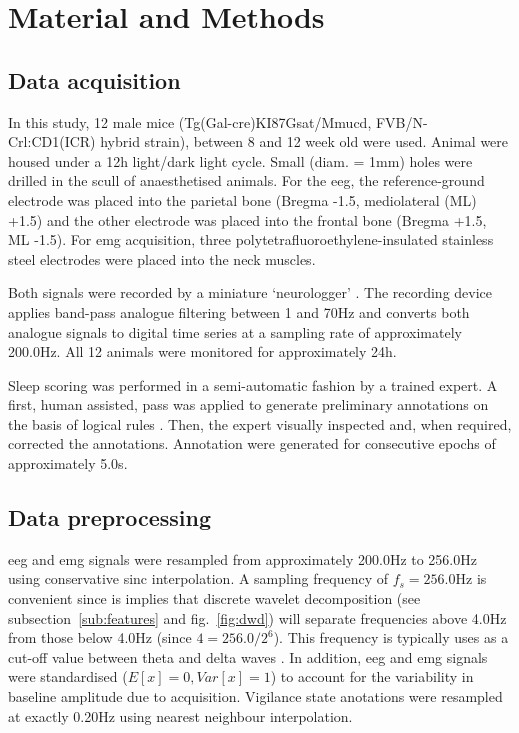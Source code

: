 \section{Material and Methods} \label{matmet}

\subsection{Data acquisition}
In this study, 12 male mice (Tg(Gal-cre)KI87Gsat/Mmucd, FVB/N-Crl:CD1(ICR) hybrid strain),
between 8 and 12 week old were used.
Animal were housed under a 12h light/dark light cycle.
Small (diam. = 1mm) holes were drilled in the scull of anaesthetised animals.
For the  \gls{eeg}, the reference-ground electrode was placed into the parietal bone (Bregma -1.5, mediolateral (ML) +1.5) and
 the other electrode was placed into the frontal bone (Bregma +1.5, ML -1.5).
For \gls{emg} acquisition, three polytetrafluoroethylene-insulated stainless steel electrodes were placed into the neck muscles.

Both signals were recorded by a miniature `neurologger' .
The recording device applies band-pass analogue filtering between 1 and 70Hz and converts both analogue signals to digital time series at a sampling rate of approximately 200.0Hz.
All 12 animals were monitored for approximately 24h.

Sleep scoring was performed in a semi-automatic fashion by a trained expert.
A first, human assisted, pass was applied to generate preliminary annotations on the basis of logical rules \citationneeded{}.
Then, the expert visually inspected and, when required, corrected the annotations.
Annotation were generated for consecutive epochs of approximately 5.0s.
\subsection{Data preprocessing}

\gls{eeg} and \gls{emg} signals were resampled from approximately 200.0Hz to 256.0Hz using
conservative sinc interpolation.
A sampling frequency of $f_s  = 256.0$Hz is convenient since is implies that discrete wavelet decomposition (see subsection~\ref{sub:features} and fig.~\ref{fig:dwd}) will separate
frequencies above 4.0Hz from those below 4.0Hz (since $4 = 256.0/{2^6} $).
This frequency is typically uses as a cut-off value between theta and delta waves \citationneeded{}.
In addition, \gls{eeg} and \gls{emg} signals were standardised ($E[x] = 0, Var[x] = 1$) to account for the variability in baseline amplitude due to acquisition.
Vigilance state anotations were resampled at exactly 0.20Hz using nearest neighbour interpolation.

